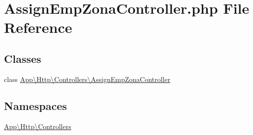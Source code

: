 \hypertarget{_assign_emp_zona_controller_8php}{}\section{Assign\+Emp\+Zona\+Controller.\+php File Reference}
\label{_assign_emp_zona_controller_8php}
\subsection*{Classes}
\begin{DoxyCompactItemize}
\item 
class \mbox{\hyperlink{class_app_1_1_http_1_1_controllers_1_1_assign_emp_zona_controller}{App\textbackslash{}\+Http\textbackslash{}\+Controllers\textbackslash{}\+Assign\+Emp\+Zona\+Controller}}
\end{DoxyCompactItemize}
\subsection*{Namespaces}
\begin{DoxyCompactItemize}
\item 
 \mbox{\hyperlink{namespace_app_1_1_http_1_1_controllers}{App\textbackslash{}\+Http\textbackslash{}\+Controllers}}
\end{DoxyCompactItemize}
